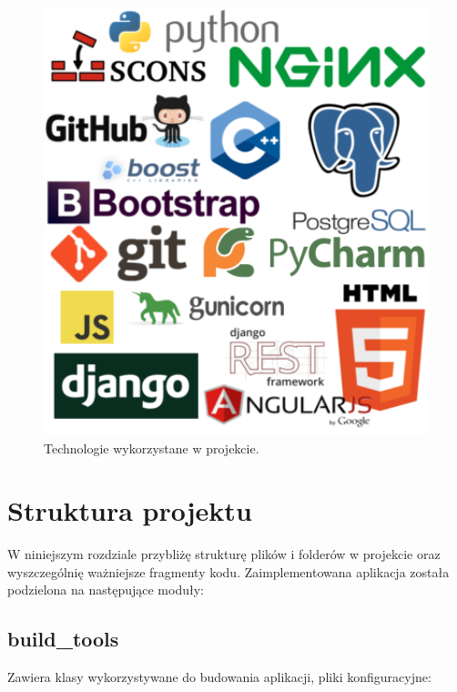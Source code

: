 \begin{figure}[h]
	\centering
	\includegraphics[width=1\textwidth]{img/loga.png}
	\caption{Technologie wykorzystane w projekcie.}
	\vspace{-0.5cm}
	\label{img:technologie}
\end{figure}


\section{Struktura projektu}
W niniejszym rozdziale przybliżę strukturę plików i folderów w projekcie oraz wyszczególnię ważniejsze fragmenty kodu.
Zaimplementowana aplikacja została podzielona na następujące moduły:

\subsection*{build\_tools}
Zawiera klasy wykorzystywane do budowania aplikacji, pliki konfiguracyjne:


